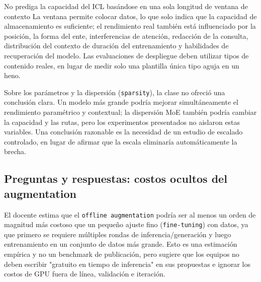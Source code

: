 \documentclass[a4paper]{article}
\begin{document}

\begin{warningbox}{No prediga la capacidad del ICL basándose en una sola longitud de ventana de contexto}
La ventana permite colocar datos, lo que solo indica que la capacidad de almacenamiento es suficiente; el rendimiento real también está influenciado por la posición, la forma del ente, interferencias de atención, redacción de la consulta, distribución del contexto de duración del entrenamiento y habilidades de recuperación del modelo. Las evaluaciones de despliegue deben utilizar tipos de contenido reales, en lugar de medir solo una plantilla única tipo aguja en un heno.
\end{warningbox}

Sobre los parámetros y la dispersión (\texttt{sparsity}), la clase no ofreció una conclusión clara. Un modelo más grande podría mejorar simultáneamente el rendimiento paramétrico y contextual; la dispersión MoE también podría cambiar la capacidad y las rutas, pero los experimentos presentados no aislaron estas variables. Una conclusión razonable es la necesidad de un estudio de escalado controlado, en lugar de afirmar que la escala eliminaría automáticamente la brecha.

\subsection{Preguntas y respuestas: costos ocultos del augmentation}

El docente estima que el \texttt{offline augmentation} podría ser al menos un orden de magnitud más costoso que un pequeño ajuste fino (\texttt{fine-tuning}) con datos, ya que primero se requiere múltiples rondas de inferencia/generación y luego entrenamiento en un conjunto de datos más grande. Esto es una estimación empírica y no un benchmark de publicación, pero sugiere que los equipos no deben escribir "gratuito en tiempo de inferencia" en sus propuestas e ignorar los costos de GPU fuera de línea, validación e iteración.

\end{document}
